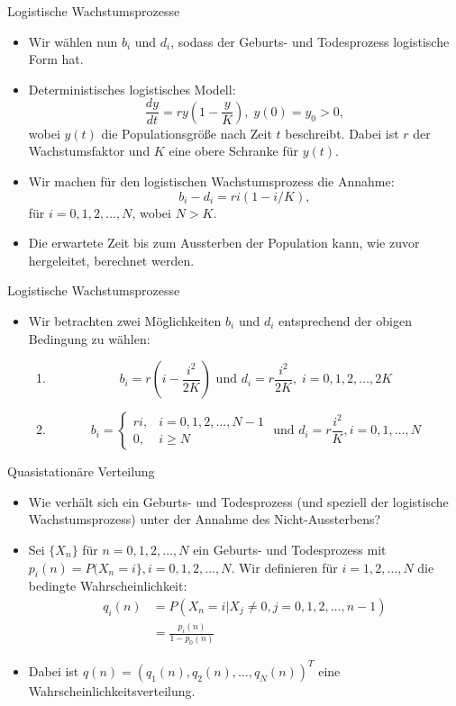 \documentclass{beamer}
\begin{document}
\begin{frame}{Logistische Wachstumsprozesse}
  \begin{itemize}
  \item Wir wählen nun $b_i$ und $d_i$, sodass der Geburts- und Todesprozess logistische Form hat.
  \item Deterministisches logistisches Modell:
    \[
      \frac{dy}{dt} = ry(1-\frac{y}{K}), \; y(0) = y_0 > 0,
    \]
    wobei $y(t)$ die Populationsgröße nach Zeit $t$ beschreibt. Dabei ist $r$ der Wachstumsfaktor und $K$ eine obere Schranke für $y(t)$.
  \item Wir machen für den logistischen Wachstumsprozess die Annahme:
    \[
      b_i - d_i = ri(1-i/K),
    \]
    für $i=0,1,2,\dots,N$, wobei $N > K$.
  \item Die erwartete Zeit bis zum Aussterben der Population kann, wie zuvor hergeleitet, berechnet werden.
  \end{itemize}
\end{frame}
\begin{frame}{Logistische Wachstumsprozesse}
  \begin{itemize}
  \item Wir betrachten zwei Möglichkeiten $b_i$ und $d_i$ entsprechend der obigen Bedingung zu wählen:
    \begin{enumerate}
    \item \[b_i = r(i - \frac{i^2}{2K}) \text{ und } d_i = r\frac{i^2}{2K}, \; i = 0,1,2,\dots,2K \]
    \item \[b_i = \begin{cases} ri,  &i = 0,1,2,\dots,N-1 \\ 0, &i \geq N \end{cases} \text{ und } d_i = r\frac{i^2}{K}, i = 0,1,\dots,N\]
    \end{enumerate}
  \end{itemize}
\end{frame}
\begin{frame}{Quasistationäre Verteilung}
  \begin{itemize}
  \item Wie verhält sich ein Geburts- und Todesprozess (und speziell der logistische Wachstumsprozess) unter der Annahme des Nicht-Aussterbens?
  \item Sei $\{X_n\}$ für $n = 0,1,2,\dots,N$ ein Geburts- und Todesprozess mit $p_i(n) = P(X_n=i\}, i = 0,1,2,\dots,N$. Wir definieren für $i = 1,2,\dots,N$ die bedingte Wahrscheinlichkeit:
    \begin{align*}
      q_i(n) &= P(X_n=i|X_j \neq 0, j = 0,1,2,\dots,n-1) \\
             &= \frac{p_i(n)}{1-p_0(n)}
    \end{align*}
  \item Dabei ist $q(n) = (q_1(n),q_2(n), \dots, q_N(n))^T$ eine Wahrscheinlichkeitsverteilung.
  \end{itemize}
\end{frame}
\end{document}
